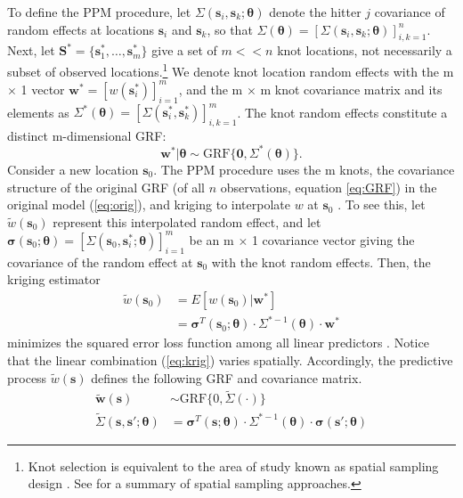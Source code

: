 To define the PPM procedure, let $\Sigma(\pmb{s}_{i}, \pmb{s}_{k}; \pmb{\theta})$ denote the hitter $j$ covariance of random effects at locations $\pmb{s}_{i}$ and $\pmb{s}_{k}$, so that $\Sigma(\pmb{\theta}) = [\Sigma(\pmb{s}_{i}, \pmb{s}_{k}; \pmb{\theta})]_{i,k=1}^{n}$. Next, let $\pmb{S}^{*} = \{\pmb{s}_{1}^{*}, \dots, \pmb{s}_{m}^{*}\}$ give a set of $m << n$ knot locations, not necessarily a subset of observed locations.\footnote{Knot selection is equivalent to the area of study known as spatial sampling design \citep{Finley2009}. See \citep{Xia2006} for a summary of spatial sampling approaches.} We denote knot location random effects with the m $\times$ 1 vector $\pmb{w}^{*} = \left[w(\pmb{s}_{i}^{*})\right]_{i=1}^{m}$, and the m $\times$ m knot covariance matrix and its elements as $\Sigma^{*}(\pmb{\theta}) = \left[\Sigma(\pmb{s}_{i}^{*}, \pmb{s}_{k}^{*})\right]_{i,k = 1}^{m}$. The knot random effects constitute a distinct m-dimensional GRF:
\begin{equation}
\pmb{w}^{*}|\pmb{\theta} \sim \text{GRF}\{\pmb{0}, \Sigma^{*}(\pmb{\theta})\}.
\end{equation}
Consider a new location $\pmb{s}_{0}$. The PPM procedure uses the m knots, the covariance structure of the original GRF (of all $n$ observations, equation \ref{eq:GRF}) in the original model (\ref{eq:orig}), and kriging to interpolate $w$ at $\pmb{s}_{0}$ \citep{Schabenberger2004}. To see this, let $\tilde{w}(\pmb{s}_{0})$ represent this interpolated random effect, and let $\pmb{\sigma}(\pmb{s}_{0};\pmb{\theta}) = \left[\Sigma(\pmb{s}_{0}, \pmb{s}_{i}^{*}; \pmb{\theta})\right]_{i = 1}^{m}$ be an m $\times$ 1 covariance vector giving the covariance of the random effect at $\pmb{s}_{0}$ with the knot random effects. Then, the kriging estimator
\begin{align}
\tilde{w}(\pmb{s}_{0}) &= E[w(\pmb{s}_{0})|\pmb{w}^{*}] \\ 
&= \pmb{\sigma}^{T}(\pmb{s}_{0};\pmb{\theta}) \cdot \Sigma^{*-1}(\pmb{\theta}) \cdot \pmb{w}^{*} \label{eq:krig}
\end{align}
minimizes the squared error loss function among all linear predictors \citep{Schabenberger2004}. Notice that the linear combination (\ref{eq:krig}) varies spatially. Accordingly, the predictive process $\tilde{w}(\pmb{s})$ defines the following GRF and covariance matrix.
\begin{align}
\tilde{\pmb{w}}(\pmb{s}) &\sim \text{GRF}\{0, \widetilde{\Sigma}(\cdot)\} \\
\widetilde{\Sigma}(\pmb{s}, \pmb{s}'; \pmb{\theta}) &= \pmb{\sigma}^{T}(\pmb{s};\pmb{\theta}) \cdot \Sigma^{*-1}(\pmb{\theta}) \cdot \pmb{\sigma}(\pmb{s}';\pmb{\theta})
\end{align}
